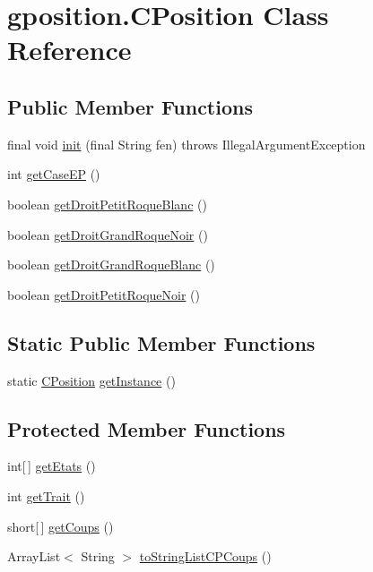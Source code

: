 \hypertarget{classgposition_1_1_c_position}{\section{gposition.\-C\-Position Class Reference}
\label{classgposition_1_1_c_position}
}
\subsection*{Public Member Functions}
\begin{DoxyCompactItemize}
\item 
final void \hyperlink{classgposition_1_1_c_position_a2e5030c36157826a55892d382b68b8e9}{init} (final String fen)  throws Illegal\-Argument\-Exception 
\item 
int \hyperlink{classgposition_1_1_c_position_a0ce8ce03945c591441be06767f7c0e8e}{get\-Case\-E\-P} ()
\item 
boolean \hyperlink{classgposition_1_1_c_position_a4739796cbe54c63c79fb883581f7971e}{get\-Droit\-Petit\-Roque\-Blanc} ()
\item 
boolean \hyperlink{classgposition_1_1_c_position_a6fc662e9f661cd9584bb8d99e8b41bdf}{get\-Droit\-Grand\-Roque\-Noir} ()
\item 
boolean \hyperlink{classgposition_1_1_c_position_a2e9aedaf551012db7099fa7c2dc67007}{get\-Droit\-Grand\-Roque\-Blanc} ()
\item 
boolean \hyperlink{classgposition_1_1_c_position_aa2462d4c33cfaa7a0d4096b8ea1ba32f}{get\-Droit\-Petit\-Roque\-Noir} ()
\end{DoxyCompactItemize}
\subsection*{Static Public Member Functions}
\begin{DoxyCompactItemize}
\item 
static \hyperlink{classgposition_1_1_c_position}{C\-Position} \hyperlink{classgposition_1_1_c_position_a4bfcc90dd6f6b5fc30f19b3f6e6623b7}{get\-Instance} ()
\end{DoxyCompactItemize}
\subsection*{Protected Member Functions}
\begin{DoxyCompactItemize}
\item 
int\mbox{[}$\,$\mbox{]} \hyperlink{classgposition_1_1_c_position_a46fdbce6551cea9f9e2332fd24708425}{get\-Etats} ()
\item 
int \hyperlink{classgposition_1_1_c_position_a34b5da36bb4cb67f89798b5c35e46f98}{get\-Trait} ()
\item 
short\mbox{[}$\,$\mbox{]} \hyperlink{classgposition_1_1_c_position_a519689698fba172c6498208a4d1d3a9b}{get\-Coups} ()
\item 
Array\-List$<$ String $>$ \hyperlink{classgposition_1_1_c_position_a33866e2203afd1be4f4b72b1f7022d9e}{to\-String\-List\-C\-P\-Coups} ()
\end{DoxyCompactItemize}


